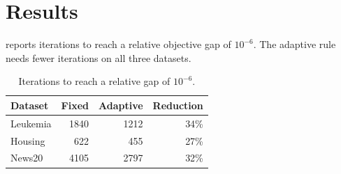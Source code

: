 \section{Results}
\label{sec:results}

 reports iterations to reach a relative objective gap of
$10^{-6}$. The adaptive rule needs fewer iterations on all three datasets.

\begin{table}[t]
  \centering
  \caption{Iterations to reach a relative gap of $10^{-6}$.}
  \label{tab:results}
  \begin{tabular}{lrrr}
    \toprule
    Dataset & Fixed & Adaptive & Reduction \\
    \midrule
    Leukemia  & 1840 & 1212 & 34\% \\
    Housing   &  622 &  455 & 27\% \\
    News20    & 4105 & 2797 & 32\% \\
    \bottomrule
  \end{tabular}
\end{table}
